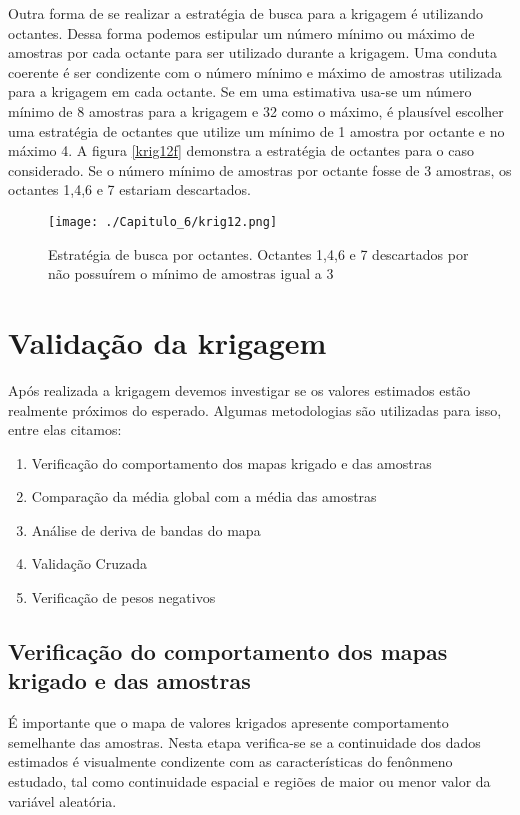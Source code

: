 Outra forma de se realizar a estratégia de busca para a krigagem é utilizando octantes. Dessa forma podemos estipular um número mínimo ou máximo de amostras por cada octante para ser utilizado durante a krigagem. Uma conduta coerente é ser condizente com o número mínimo e máximo de amostras utilizada para a krigagem em cada octante. Se em uma estimativa usa-se um número mínimo de 8 amostras para a krigagem e 32 como o máximo, é plausível escolher uma estratégia de octantes que utilize um mínimo de 1 amostra por octante e no máximo 4. A figura \eqref{krig12f} demonstra a estratégia de octantes para o caso considerado. Se o número mínimo de amostras por octante fosse de 3 amostras, os octantes 1,4,6 e 7 estariam descartados. 

\begin{figure}[H]
	\centering
	\texttt{[image: ./Capitulo\_6/krig12.png]}
	\caption{Estratégia de busca por octantes. Octantes 1,4,6 e 7 descartados por não possuírem o mínimo de amostras igual a 3 }
	\label{krig12f}
\end{figure}

\section{Validação da krigagem}

Após realizada a krigagem devemos investigar se os valores estimados estão realmente próximos do esperado. Algumas metodologias são utilizadas para isso, entre elas citamos:

\begin{enumerate} 
	\item Verificação do comportamento dos mapas krigado e das amostras
	\item Comparação da média global com a média das amostras
	\item Análise de deriva de bandas do mapa 
	\item Validação Cruzada
	\item Verificação de pesos negativos	
\end{enumerate}

\subsection{Verificação do comportamento dos mapas krigado e das amostras}

É importante que o mapa de valores krigados apresente comportamento semelhante das amostras. Nesta etapa verifica-se se a continuidade dos dados estimados é visualmente condizente com as características do fenônmeno estudado, tal como continuidade espacial e regiões de maior ou menor valor da variável aleatória. 

